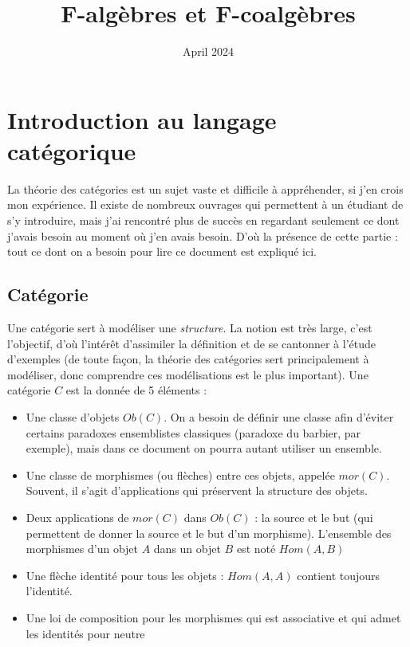 \documentclass{article}
\title{F-algèbres et F-coalgèbres}
\date{April 2024}
\begin{document}
\maketitle
\newpage
\tableofcontents
\newpage

\section{Introduction au langage catégorique}

La théorie des catégories est un sujet vaste et difficile à appréhender, si j'en crois mon expérience. Il existe de nombreux ouvrages qui permettent à un étudiant de s'y introduire, mais j'ai rencontré plus de succès en regardant seulement ce dont j'avais besoin au moment où j'en avais besoin. D'où la présence de cette partie : tout ce dont on a besoin pour lire ce document est expliqué ici.

\subsection{Catégorie}

Une catégorie sert à modéliser une \textit{structure}. La notion est très large, c'est l'objectif, d'où l'intérêt d'assimiler la définition et de se cantonner à l'étude d'exemples (de toute façon, la théorie des catégories sert principalement à modéliser, donc comprendre ces modélisations est le plus important). Une catégorie $C$ est la donnée de 5 éléments : 
\begin{itemize}
    \item Une classe d'objets $Ob(C)$. On a besoin de définir une classe afin d'éviter certains paradoxes ensemblistes classiques (paradoxe du barbier, par exemple), mais dans ce document on pourra autant utiliser un ensemble.
    \item Une classe de morphismes (ou flèches) entre ces objets, appelée $mor(C)$. Souvent, il s'agit d'applications qui préservent la structure des objets.
    \item Deux applications de $mor(C)$ dans $Ob(C)$ : la source et le but (qui permettent de donner la source et le but d'un morphisme). L'ensemble des morphismes d'un objet $A$ dans un objet $B$ est noté $Hom(A,B)$ 
    \item Une flèche identité pour tous les objets : $Hom(A,A)$ contient toujours l'identité.
    \item Une loi de composition pour les morphismes qui est associative et qui admet les identités pour neutre
\end{itemize}
\end{document}
